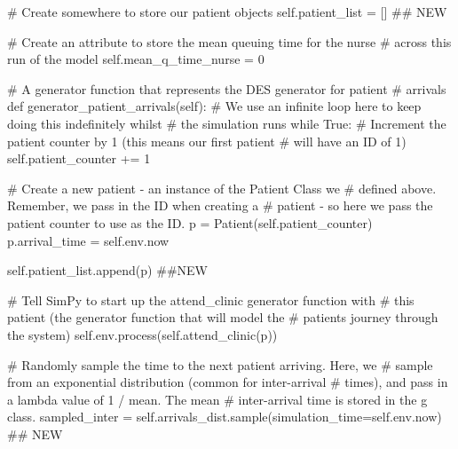 \documentclass[
  letterpaper,
  DIV=11,
  numbers=noendperiod]{scrreprt}
\newenvironment{Shaded}{}{}
\newcommand{\CommentTok}[1]{\textcolor[rgb]{0.42,0.45,0.49}{#1}}
\newcommand{\ControlFlowTok}[1]{\textcolor[rgb]{0.84,0.23,0.29}{#1}}
\newcommand{\DecValTok}[1]{\textcolor[rgb]{0.00,0.36,0.77}{#1}}
\newcommand{\KeywordTok}[1]{\textcolor[rgb]{0.84,0.23,0.29}{#1}}
\newcommand{\NormalTok}[1]{\textcolor[rgb]{0.14,0.16,0.18}{#1}}
\newcommand{\OperatorTok}[1]{\textcolor[rgb]{0.14,0.16,0.18}{#1}}
\newcommand{\VariableTok}[1]{\textcolor[rgb]{0.89,0.38,0.04}{#1}}
\begin{document}
\begin{tcolorbox}
\begin{Shaded}
\begin{Highlighting}[]
        \CommentTok{\# Create somewhere to store our patient objects}
        \VariableTok{self}\NormalTok{.patient\_list }\OperatorTok{=}\NormalTok{ [] }\CommentTok{\#\# NEW}

        \CommentTok{\# Create an attribute to store the mean queuing time for the nurse}
        \CommentTok{\# across this run of the model}
        \VariableTok{self}\NormalTok{.mean\_q\_time\_nurse }\OperatorTok{=} \DecValTok{0}

    \CommentTok{\# A generator function that represents the DES generator for patient}
    \CommentTok{\# arrivals}
    \KeywordTok{def}\NormalTok{ generator\_patient\_arrivals(}\VariableTok{self}\NormalTok{):}
        \CommentTok{\# We use an infinite loop here to keep doing this indefinitely whilst}
        \CommentTok{\# the simulation runs}
        \ControlFlowTok{while} \VariableTok{True}\NormalTok{:}
            \CommentTok{\# Increment the patient counter by 1 (this means our first patient}
            \CommentTok{\# will have an ID of 1)}
            \VariableTok{self}\NormalTok{.patient\_counter }\OperatorTok{+=} \DecValTok{1}

            \CommentTok{\# Create a new patient {-} an instance of the Patient Class we}
            \CommentTok{\# defined above.  Remember, we pass in the ID when creating a}
            \CommentTok{\# patient {-} so here we pass the patient counter to use as the ID.}
\NormalTok{            p }\OperatorTok{=}\NormalTok{ Patient(}\VariableTok{self}\NormalTok{.patient\_counter)}
\NormalTok{            p.arrival\_time }\OperatorTok{=} \VariableTok{self}\NormalTok{.env.now}

            \VariableTok{self}\NormalTok{.patient\_list.append(p) }\CommentTok{\#\#NEW}

            \CommentTok{\# Tell SimPy to start up the attend\_clinic generator function with}
            \CommentTok{\# this patient (the generator function that will model the}
            \CommentTok{\# patient\textquotesingle{}s journey through the system)}
            \VariableTok{self}\NormalTok{.env.process(}\VariableTok{self}\NormalTok{.attend\_clinic(p))}

            \CommentTok{\# Randomly sample the time to the next patient arriving.  Here, we}
            \CommentTok{\# sample from an exponential distribution (common for inter{-}arrival}
            \CommentTok{\# times), and pass in a lambda value of 1 / mean.  The mean}
            \CommentTok{\# inter{-}arrival time is stored in the g class.}
\NormalTok{            sampled\_inter }\OperatorTok{=} \VariableTok{self}\NormalTok{.arrivals\_dist.sample(simulation\_time}\OperatorTok{=}\VariableTok{self}\NormalTok{.env.now) }\CommentTok{\#\# NEW}


\end{Highlighting}
\end{Shaded}
\end{tcolorbox}
\end{document}
